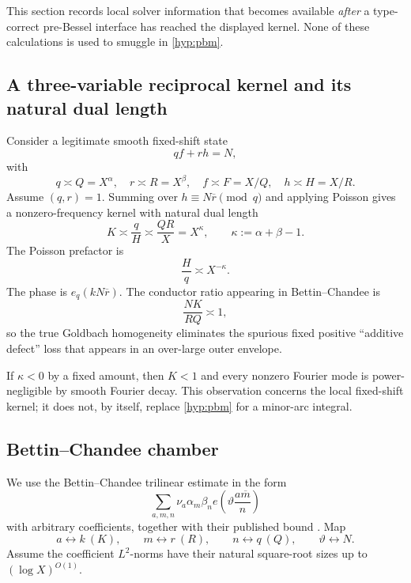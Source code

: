 \documentclass[11pt]{article}
\theoremstyle{definition}
\theoremstyle{remark}
\newcommand{\1}{\mathbf 1}
\begin{document}
This section records local solver information that becomes available \emph{after} a type-correct pre-Bessel interface has reached the displayed kernel.  None of these calculations is used to smuggle in \cref{hyp:pbm}.

\subsection{A three-variable reciprocal kernel and its natural dual length}

Consider a legitimate smooth fixed-shift state
\begin{equation}\label{eq:qfrh}
 qf+rh=N,
\end{equation}
with
\[
 q\asymp Q=X^\alpha,
 \quad
 r\asymp R=X^\beta,
 \quad
 f\asymp F=X/Q,
 \quad
 h\asymp H=X/R.
\]
Assume \((q,r)=1\).  Summing over \(h\equiv N\overline r\pmod q\) and applying Poisson gives a nonzero-frequency kernel with natural dual length
\begin{equation}\label{eq:Kdual}
 K\asymp\frac qH\asymp\frac{QR}{X}=X^\kappa,
 \qquad
 \kappa:=\alpha+\beta-1.
\end{equation}
The Poisson prefactor is
\[
 \frac Hq\asymp X^{-\kappa}.
\]
The phase is \(e_q(kN\overline r)\).  The conductor ratio appearing in Bettin--Chandee is
\begin{equation}\label{eq:BCconductor}
 \frac{N K}{RQ}\asymp1,
\end{equation}
so the true Goldbach homogeneity eliminates the spurious fixed positive ``additive defect'' loss that appears in an over-large outer envelope.

If \(\kappa<0\) by a fixed amount, then \(K<1\) and every nonzero Fourier mode is power-negligible by smooth Fourier decay.  This observation concerns the local fixed-shift kernel; it does not, by itself, replace \cref{hyp:pbm} for a minor-arc integral.

\subsection{Bettin--Chandee chamber}

We use the Bettin--Chandee trilinear estimate in the form
\[
 \sum_{a,m,n}\nu_a\alpha_m\beta_n
 e\!\left(\vartheta\frac{a\overline m}{n}\right)
\]
with arbitrary coefficients, together with their published bound \cite{BC}.  Map
\[
 a\leftrightarrow k\ (K),
 \qquad
 m\leftrightarrow r\ (R),
 \qquad
 n\leftrightarrow q\ (Q),
 \qquad
 \vartheta\leftrightarrow N.
\]
Assume the coefficient \(L^2\)-norms have their natural square-root sizes up to \((\log X)^{O(1)}\).
\end{document}
